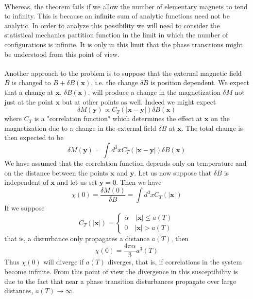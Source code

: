 \documentclass[cyan]{elegantnote}
\begin{document}
\\
Whereas, the theorem fails if we allow the number of elementary magnets to tend to infinity. This is because an infinite sum of analytic functions need not be analytic. 
In order to analyze this possibility we will need to consider the statistical mechanics partition function in the limit in which the number of configurations is infinite. It is only in this limit that the phase transitions might be understood from this point of view.
\\ \\
Another approach to the problem is to suppose that the external magnetic field $B$ is changed to $B + \delta B(\bm{x})$, i.e. the change $\delta B$ is position dependent. We expect that a change at $\bm{x}$, $\delta B(\bm{x})$, will produce a change in the magnetization $\delta M$ not just at the point $\bm{x}$ but at other points as well. Indeed we might expect
\[\delta M(\bm{y}) \propto C_T(|\bm{x}-\bm{y}|)\delta B(\bm{x})\]
where $C_T$ is a "correlation function" which determines the effect at $\bm{x}$ on the magnetization due to a change in the external field $\delta B$ at $\bm{x}$. The total change
is then expected to be
\[\delta M(\bm{y}) = \int d^3x C_T(|\bm{x}-\bm{y}|)\delta B(\bm{x})\]
We have assumed that the correlation function depends only on temperature and on the distance between the points $\bm{x}$ and $\bm{y}$.
Let us now suppose that $\delta B$ is independent of $\bm{x}$ and let us set $\bm{y} = 0$. Then we have
\[\chi(0) = \frac{\delta M(0)}{\delta B} = \int d^3x C_T(|\bm{x}|)\]
If we suppose
\[C_T(|\bm{x}|) = \begin{cases} \alpha \quad |\bm{x}| \leq a(T) \\ 0 \quad |\bm{x}| > a(T) \end{cases}\]
that is, a disturbance only propagates a distance $a(T)$, then
\[\chi(0) = \frac{4\pi \alpha}{3} a^3(T)\]
Thus $\chi(0)$ will diverge if $a(T)$ diverges, that is, if correlations in the system become infinite. From this point of view the divergence in this susceptibility is due to the fact that near a phase transition disturbances propagate over large distances, $a(T) \to \infty$. 
\end{document}
